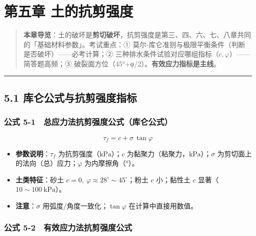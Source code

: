 \documentclass[
]{article}
\providecommand{\tightlist}{%
  \setlength{\itemsep}{0pt}\setlength{\parskip}{0pt}}
\begin{document}
\newpage

\section{第五章
土的抗剪强度}\label{ux7b2cux4e94ux7ae0-ux571fux7684ux6297ux526aux5f3aux5ea6}

\begin{quote}
\textbf{本章导览}：土的破坏是\textbf{剪切破坏}，抗剪强度是第三、四、六、七、八章共同的「基础材料参数」。考试重点：①
莫尔-库仑准则与极限平衡条件（判断是否破坏）------必考计算；②
三种排水条件试验对应哪组指标（\(c,\varphi\)）------简答题高频；③
破裂面方位（45°+φ/2）。\textbf{有效应力指标是主线}。
\end{quote}

\begin{center}\rule{0.5\linewidth}{0.5pt}\end{center}

\subsection{5.1
库仑公式与抗剪强度指标}\label{ux5e93ux4ed1ux516cux5f0fux4e0eux6297ux526aux5f3aux5ea6ux6307ux6807}

\subsubsection{公式
5-1　总应力法抗剪强度公式（库仑公式）}\label{ux516cux5f0f-5-1-ux603bux5e94ux529bux6cd5ux6297ux526aux5f3aux5ea6ux516cux5f0fux5e93ux4ed1ux516cux5f0f}

\[\boxed{\tau_f=c+\sigma\,\tan\varphi}\]

\begin{itemize}
\tightlist
\item
  \textbf{参数说明}：\(\tau_f\) 为抗剪强度（\(\mathrm{kPa}\)）；\(c\)
  为黏聚力（粘聚力，\(\mathrm{kPa}\)）；\(\sigma\)
  为剪切面上的法向（总）应力；\(\varphi\) 为内摩擦角（°）。
\item
  \textbf{土类特征}：砂土
  \(c=0,\ \varphi\approx28^{\circ}\sim45^{\circ}\)；粉土 \(c\)
  小；黏性土 \(c\) 显著（\(10\sim100\ \mathrm{kPa}\)）。
\item
  \textbf{注意}：\(\sigma\) 用弧度/角度一致化；\(\tan\varphi\)
  在计算中直接用数值。
\end{itemize}

\subsubsection{公式
5-2　有效应力法抗剪强度公式}\label{ux516cux5f0f-5-2-ux6709ux6548ux5e94ux529bux6cd5ux6297ux526aux5f3aux5ea6ux516cux5f0f}
\end{document}
